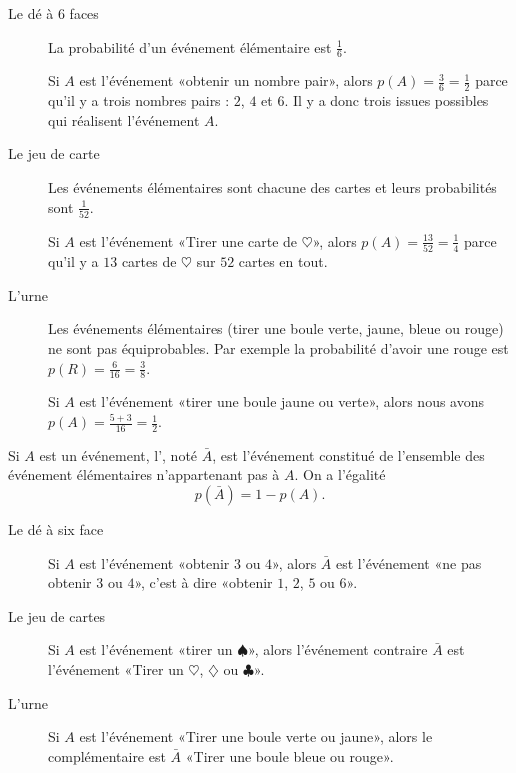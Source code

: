 \begin{example}
    \begin{description}
        \item[Le dé à 6 faces]
            La probabilité d'un événement élémentaire est \( \frac{1}{ 6 }\).

            Si \( A\) est l'événement «obtenir un nombre pair», alors \( p(A)=\frac{ 3 }{ 6 }=\frac{ 1 }{2}\) parce qu'il y a trois nombres pairs : \( 2\), \( 4\) et \( 6\). Il y a donc trois issues possibles qui réalisent l'événement \( A\).
        \item[Le jeu de carte]
            Les événements élémentaires sont chacune des cartes et leurs probabilités sont \( \frac{1}{ 52 }\). 
            
            
            Si \( A\) est l'événement «Tirer une carte de \( \heartsuit\)», alors \( p(A)=\frac{ 13 }{ 52 }=\frac{1}{ 4 }\) parce qu'il y a \( 13\) cartes de \( \heartsuit\) sur \( 52\) cartes en tout.

        \item[L'urne] Les événements élémentaires (tirer une boule verte, jaune, bleue ou rouge) ne sont pas équiprobables. Par exemple la probabilité d'avoir une rouge est \( p(R)=\frac{ 6 }{ 16 }=\frac{ 3 }{ 8 }\).

            Si \( A\) est l'événement «tirer une boule jaune ou verte», alors nous avons \( p(A)=\frac{ 5+3 }{ 16 }=\frac{ 1 }{ 2 }\).
    \end{description}
\end{example}

\begin{definition}
    Si \( A\) est un événement, l', noté \( \bar A\), est l'événement constitué de l'ensemble des événement élémentaires n'appartenant pas à \( A\). On a l'égalité
    \begin{equation}
        p(\bar A)=1-p(A).
    \end{equation}
\end{definition}

\begin{example}
    \begin{description}
        \item[Le dé à six face] Si \( A\) est l'événement «obtenir \( 3\) ou \( 4\)», alors \( \bar A\) est l'événement «ne pas obtenir \( 3\) ou \( 4\)», c'est à dire «obtenir \( 1\), \( 2\), \( 5\) ou \( 6\)».
        \item[Le jeu de cartes] Si \( A\) est l'événement «tirer un \( \spadesuit\)», alors l'événement contraire \( \bar A\) est l'événement «Tirer un \( \heartsuit\), \( \diamondsuit\) ou \( \clubsuit\)».
        \item[L'urne] Si \( A\) est l'événement «Tirer une boule verte ou jaune», alors le complémentaire est \( \bar A\) «Tirer une boule bleue ou rouge».
    \end{description}
\end{example}

